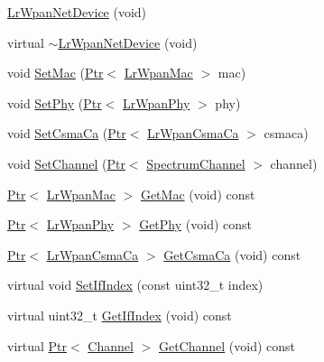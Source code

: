 \begin{DoxyCompactItemize}
\item 
\hyperlink{classns3_1_1LrWpanNetDevice_a13831cf68e3c1a3e052509e3e2dd2266}{Lr\+Wpan\+Net\+Device} (void)
\item 
virtual \hyperlink{classns3_1_1LrWpanNetDevice_a096bf042668647d4159493ae2aeb5b4e}{$\sim$\+Lr\+Wpan\+Net\+Device} (void)
\item 
void \hyperlink{classns3_1_1LrWpanNetDevice_aa36a97b6898c9b5b2dd4f6d956eda590}{Set\+Mac} (\hyperlink{classns3_1_1Ptr}{Ptr}$<$ \hyperlink{classns3_1_1LrWpanMac}{Lr\+Wpan\+Mac} $>$ mac)
\item 
void \hyperlink{classns3_1_1LrWpanNetDevice_a521c26ef227a41d835ee5ee6ed783480}{Set\+Phy} (\hyperlink{classns3_1_1Ptr}{Ptr}$<$ \hyperlink{classns3_1_1LrWpanPhy}{Lr\+Wpan\+Phy} $>$ phy)
\item 
void \hyperlink{classns3_1_1LrWpanNetDevice_a36bff9613507b175c91c3493b923e41c}{Set\+Csma\+Ca} (\hyperlink{classns3_1_1Ptr}{Ptr}$<$ \hyperlink{classns3_1_1LrWpanCsmaCa}{Lr\+Wpan\+Csma\+Ca} $>$ csmaca)
\item 
void \hyperlink{classns3_1_1LrWpanNetDevice_a3a16a06be6078dcc9b54d705bf8bc98a}{Set\+Channel} (\hyperlink{classns3_1_1Ptr}{Ptr}$<$ \hyperlink{classns3_1_1SpectrumChannel}{Spectrum\+Channel} $>$ channel)
\item 
\hyperlink{classns3_1_1Ptr}{Ptr}$<$ \hyperlink{classns3_1_1LrWpanMac}{Lr\+Wpan\+Mac} $>$ \hyperlink{classns3_1_1LrWpanNetDevice_a1937e69c08baf66ebb5c9d937e52659a}{Get\+Mac} (void) const 
\item 
\hyperlink{classns3_1_1Ptr}{Ptr}$<$ \hyperlink{classns3_1_1LrWpanPhy}{Lr\+Wpan\+Phy} $>$ \hyperlink{classns3_1_1LrWpanNetDevice_ae5f566c0d7718541c5520ac8508bd140}{Get\+Phy} (void) const 
\item 
\hyperlink{classns3_1_1Ptr}{Ptr}$<$ \hyperlink{classns3_1_1LrWpanCsmaCa}{Lr\+Wpan\+Csma\+Ca} $>$ \hyperlink{classns3_1_1LrWpanNetDevice_a4db19567a7029c54950a529cdc8a0a72}{Get\+Csma\+Ca} (void) const 
\item 
virtual void \hyperlink{classns3_1_1LrWpanNetDevice_a034bf6de64d9d362741a0c595c8ce3ad}{Set\+If\+Index} (const uint32\+\_\+t index)
\item 
virtual uint32\+\_\+t \hyperlink{classns3_1_1LrWpanNetDevice_a5ea979a3ce3e03ef060ae7c33efaebfa}{Get\+If\+Index} (void) const 
\item 
virtual \hyperlink{classns3_1_1Ptr}{Ptr}$<$ \hyperlink{classns3_1_1Channel}{Channel} $>$ \hyperlink{classns3_1_1LrWpanNetDevice_abdc2d1bd1f0342e8526cee62e38df5b4}{Get\+Channel} (void) const 

\end{DoxyCompactItemize}
